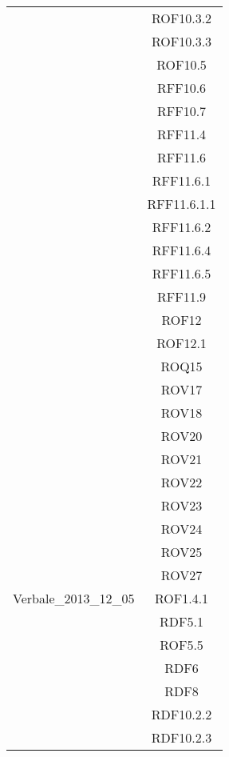 \begin{longtable}{|c|c|}
& ROF10.3.2\\
& ROF10.3.3\\
& ROF10.5\\
& RFF10.6\\
& RFF10.7\\
& RFF11.4\\
& RFF11.6\\
& RFF11.6.1\\
& RFF11.6.1.1\\
& RFF11.6.2\\
& RFF11.6.4\\
& RFF11.6.5\\
& RFF11.9\\
& ROF12\\
& ROF12.1\\
& ROQ15\\
& ROV17\\
& ROV18\\
& ROV20\\
& ROV21\\
& ROV22\\
& ROV23\\
& ROV24\\
& ROV25\\
& ROV27\\


\midrule
Verbale\_2013\_12\_05
& ROF1.4.1\\
& RDF5.1\\
& ROF5.5\\
& RDF6\\
& RDF8\\
& RDF10.2.2\\
& RDF10.2.3\\


\end{longtable}
